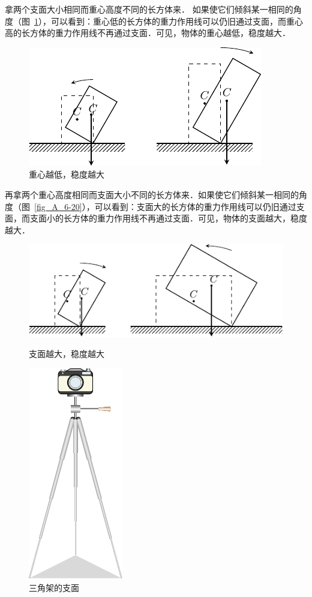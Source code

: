 拿两个支面大小相同而重心高度不同的长方体来．
如果使它们倾斜某一相同的角度（图~\ref{fig_A_6-19}），可以看到：重心低的长方体的重力作用线可以仍旧通过支面，而重心高的长方体的重力作用线不再通过支面．可见，物体的重心越低，稳度越大．
\begin{figure}[htbp]
	\centering
	\includegraphics{fig/A/6-19.pdf}
	\caption{重心越低，稳度越大}\label{fig_A_6-19}
\end{figure}

再拿两个重心高度相同而支面大小不同的长方体来．如果使它们倾斜某一相同的角度（图~\ref{fig_A_6-20}），可以看到：支面大的长方体的重力作用线可以仍旧通过支面，而支面小的长方体的重力作用线不再通过支面．可见，物体的支面越大，稳度越大．
\begin{figure}[htbp]
    \centering
    \begin{minipage}[t]{0.4\linewidth}
    	\centering
    	\includegraphics{fig/A/6-20.pdf}
    	\caption{支面越大，稳度越大}\label{fig_A_6-20}
    \end{minipage}
    \hfil
    \begin{minipage}[t]{0.4\linewidth}
    	\centering
    	\includegraphics{fig/A/6-21.pdf}
    	\caption{三角架的支面}\label{fig_A_6-21}
    \end{minipage}
\end{figure}


